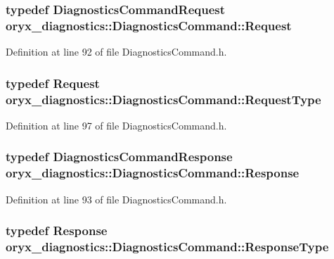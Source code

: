 \subsubsection[{\-Request}]{\setlength{\rightskip}{0pt plus 5cm}typedef {\bf \-Diagnostics\-Command\-Request} {\bf oryx\-\_\-diagnostics\-::\-Diagnostics\-Command\-::\-Request}}\label{structoryx__diagnostics_1_1DiagnosticsCommand_a35ad264dd3b73002217c6f5aa11863ef}


\-Definition at line 92 of file \-Diagnostics\-Command.\-h.

\subsubsection[{\-Request\-Type}]{\setlength{\rightskip}{0pt plus 5cm}typedef {\bf \-Request} {\bf oryx\-\_\-diagnostics\-::\-Diagnostics\-Command\-::\-Request\-Type}}\label{structoryx__diagnostics_1_1DiagnosticsCommand_a6dd6b14bb69c1accb7c7b82eafc3291f}


\-Definition at line 97 of file \-Diagnostics\-Command.\-h.

\subsubsection[{\-Response}]{\setlength{\rightskip}{0pt plus 5cm}typedef {\bf \-Diagnostics\-Command\-Response} {\bf oryx\-\_\-diagnostics\-::\-Diagnostics\-Command\-::\-Response}}\label{structoryx__diagnostics_1_1DiagnosticsCommand_a5b63bf06c4108c1151b6b21b2ab5299e}


\-Definition at line 93 of file \-Diagnostics\-Command.\-h.

\subsubsection[{\-Response\-Type}]{\setlength{\rightskip}{0pt plus 5cm}typedef {\bf \-Response} {\bf oryx\-\_\-diagnostics\-::\-Diagnostics\-Command\-::\-Response\-Type}}\label{structoryx__diagnostics_1_1DiagnosticsCommand_a2da15383d2daca4a8475909ad51d87fa}


